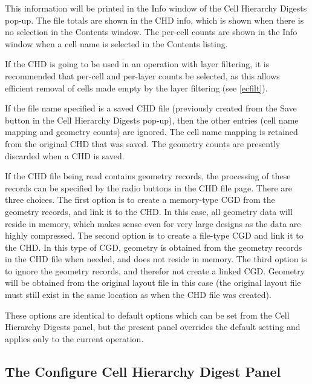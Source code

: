 This information will be printed in the {\cb Info} window of the {\cb
Cell Hierarchy Digests} pop-up.  The file totals are shown in the CHD
info, which is shown when there is no selection in the {\cb Contents}
window.  The per-cell counts are shown in the {\cb Info} window when a
cell name is selected in the {\cb Contents} listing.

If the CHD is going to be used in an operation with layer filtering,
it is recommended that {\cb per-cell and per-layer counts} be
selected, as this allows efficient removal of cells made empty by the
layer filtering (see \ref{ecfilt}).

If the file name specified is a saved CHD file (previously created
from the {\cb Save} button in the {\cb Cell Hierarchy Digests}
pop-up), then the other entries (cell name mapping and geometry
counts) are ignored.  The cell name mapping is retained from the
original CHD that was saved.  The geometry counts are presently
discarded when a CHD is saved.

If the CHD file being read contains geometry records, the processing
of these records can be specified by the radio buttons in the {\cb CHD
file} page.  There are three choices.  The first option is to create a
memory-type CGD from the geometry records, and link it to the CHD.  In
this case, all geometry data will reside in memory, which makes sense
even for very large designs as the data are highly compressed.  The
second option is to create a file-type CGD and link it to the CHD.  In
this type of CGD, geometry is obtained from the geometry records in
the CHD file when needed, and does not reside in memory.  The third
option is to ignore the geometry records, and therefor not create a
linked CGD.  Geometry will be obtained from the original layout file
in this case (the original layout file must still exist in the same
location as when the CHD file was created).

These options are identical to default options which can be set from
the {\cb Cell Hierarchy Digests} panel, but the present panel
overrides the default setting and applies only to the current
operation.


\subsection{The {\cb Configure Cell Hierarchy Digest} Panel}
\label{chdcfg}


